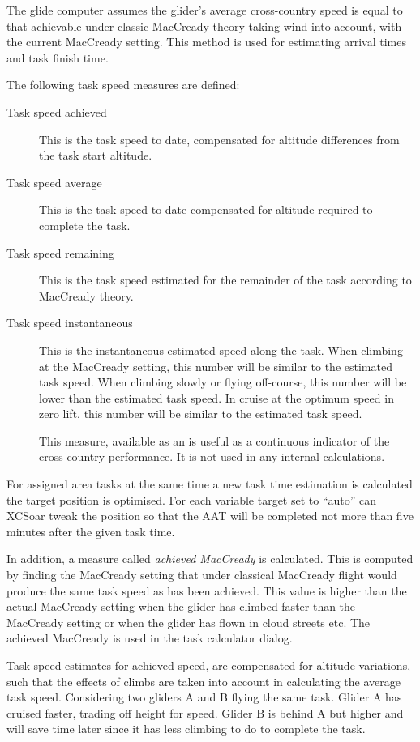 \documentclass[a4paper,12pt]{refrep}
\begin{document}
The glide computer assumes the glider's average cross-country speed is
equal to that achievable under classic MacCready theory taking wind
into account, with the current MacCready setting.  This method is used
for estimating arrival times and task finish time.

The following task speed measures are defined:
\begin{description}
\item[Task speed achieved]  This is the task speed to date, compensated
for altitude differences from the task start altitude.
\item[Task speed average]  This is the task speed to date compensated
for altitude required to complete the task.
\item[Task speed remaining]  This is the task speed estimated for the
  remainder of the task according to MacCready theory.
\item[Task speed instantaneous]  This is the instantaneous estimated speed 
along the task.  When climbing at the MacCready setting, this number
will be similar to the estimated task speed.  When climbing slowly or
flying off-course, this number will be lower than the estimated task
speed.  In cruise at the optimum speed in zero lift, this number will
be similar to the estimated task speed.

This measure, available as an {\InfoBox} is useful as a continuous
indicator of the cross-country performance.  It is not used in any
internal calculations.
\end{description}

For assigned area tasks at the same time a new task time estimation is
calculated the target position is optimised. \tip For each variable target set
to ``auto'' can XCSoar tweak the position so that the AAT will be completed not
more than five minutes after the given task time.

In addition, a measure called {\em achieved MacCready} is calculated.
This is computed by finding the MacCready setting that under classical
MacCready flight would produce the same task speed as has been
achieved.  This value is higher than the actual MacCready setting when
the glider has climbed faster than the MacCready setting or when the
glider has flown in cloud streets etc.  The achieved MacCready is used
in the task calculator dialog.

Task speed estimates for achieved speed, are compensated for altitude
variations, such that the effects of climbs are taken into account in
calculating the average task speed.  Considering two gliders A and B
flying the same task.  Glider A has cruised faster, trading off height
for speed.  Glider B is behind A but higher and will save time later
since it has less climbing to do to complete the task.
\end{document}
